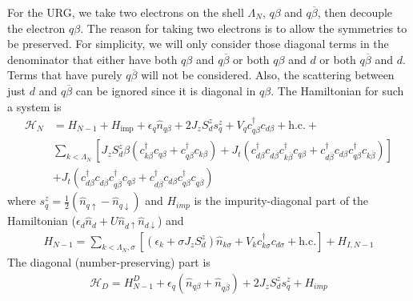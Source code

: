 \documentclass[twoside]{report}
\numberwithin{equation}{section}
\begin{document}
For the URG, we take two electrons on the shell \(\Lambda_N\), \(q\beta\) and \(q\overline\beta\), then decouple the electron \(q\beta\). The reason for taking two electrons is to allow the symmetries to be preserved. For simplicity, we will only consider those diagonal terms in the denominator that either have both \(q\beta\) and \(q\overline\beta\) or  both \(q\beta\) and \(d\) or both \(q\overline\beta\) and \(d\). Terms that have purely \(q\overline\beta\) will not be considered. Also, the scattering between just \(d\) and \(q\overline\beta\) can be ignored since it is diagonal in \(q\beta\). The Hamiltonian for such a system is
\begin{equation}\begin{aligned}
\mathcal{H}_N &= H_{N-1} + H_\text{imp} + \epsilon_q\hat n_{q\beta} + 2J_z S^z_d s^z_q + V_q c^\dagger_{q\beta}c_{d\beta} + \text{h.c.} +\\
	      & \sum_{k<\Lambda_N}\left[J_z S^z_d \beta \left(c^\dagger_{k\beta}c_{q\beta} + c^\dagger_{q\beta}c_{k\beta}\right) + J_t \left(c^\dagger_{d\beta}c_{d\overline\beta}c^\dagger_{k\overline\beta}c_{q \beta} + c^\dagger_{d\overline\beta}c_{d\beta}c^\dagger_{q\beta}c_{k\overline\beta}\right)\right]\\
	      & + J_t \left(c^\dagger_{d\beta}c_{d\overline\beta}c^\dagger_{q\overline\beta}c_{q \beta} + c^\dagger_{d\overline\beta}c_{d\beta}c^\dagger_{q\beta}c_{q\overline\beta}\right)
\end{aligned}\end{equation}
where \(s_q^z = \frac{1}{2}\left(\hat n_{q\uparrow} - \hat n_{q\downarrow}\right)\) and \(H_{imp}\) is the impurity-diagonal part of the Hamiltonian (\(\epsilon_d \hat n_d + U\hat n_{d\uparrow}\hat n_{d\downarrow}\)) and 
\begin{equation}\begin{aligned}
	H_{N-1} = \sum_{k<\Lambda_N,\sigma}\left[\left(\epsilon_k +  \sigma J_z S^z_d\right)\hat n_{k\sigma} + V_k c^\dagger_{k\sigma}c_{d\sigma} + \text{h.c.}\right] + H_{I,N-1}
\end{aligned}\end{equation}
The diagonal (number-preserving) part is
\begin{equation}\begin{aligned}
	\mathcal{H}_D = H^D_{N-1} + \epsilon_q\left(\hat n_{q\beta} + \hat n_{q\overline\beta}\right) + 2J_z S^z_ds^z_{q} + H_{imp}\\
\end{aligned}\end{equation}
\end{document}
